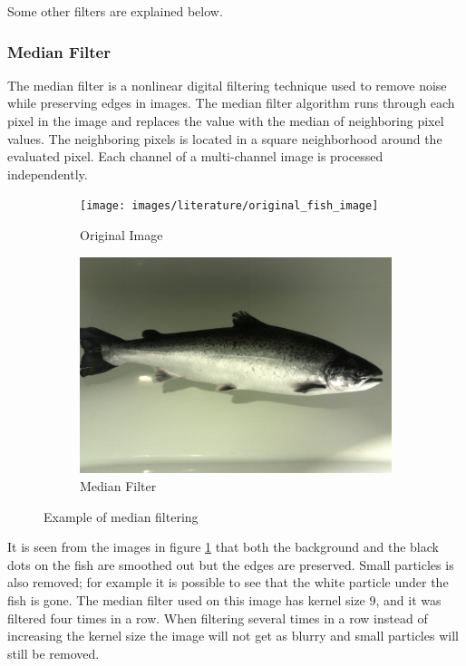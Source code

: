 Some other filters are explained below.


\subsubsection{Median Filter}
The median filter is a nonlinear digital filtering technique used to remove noise while preserving edges in images. The median filter algorithm runs through each pixel in the image and replaces the value with the median of neighboring pixel values. The neighboring pixels is located in a square neighborhood around the evaluated pixel. Each channel of a multi-channel image is processed independently. 

\begin{figure}[h]
    \centering
    \begin{subfigure}{0.5\textwidth}
        \centering
        \texttt{[image: images/literature/original\_fish\_image]}
        \caption{Original Image}
    \end{subfigure}%
    \begin{subfigure}{.5\textwidth}
        \centering
        \includegraphics[width=.9\linewidth]{images/literature/median_filter}
        \caption{Median Filter}
    \end{subfigure}
    \caption{Example of median filtering}
    \label{fig:median_filter}
\end{figure}

It is seen from the images in figure \ref{fig:median_filter} that both the background and the black dots on the fish are smoothed out but the edges are preserved. Small particles is also removed; for example it is possible to see that the white particle under the fish is gone. The median filter used on this image has kernel size 9, and it was filtered four times in a row. When filtering several times in a row instead of increasing the kernel size the image will not get as blurry and small particles will still be removed.


